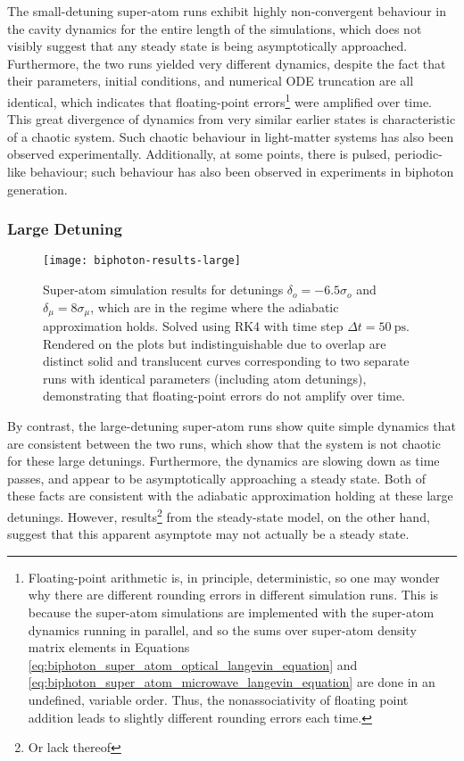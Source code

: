 The small-detuning super-atom runs exhibit highly non-convergent behaviour in the cavity dynamics for the entire length of the simulations, which does not visibly suggest that any steady state is being asymptotically approached. Furthermore, the two runs yielded very different dynamics, despite the fact that their parameters, initial conditions, and numerical ODE truncation are all identical, which indicates that floating-point errors\footnote{Floating-point arithmetic is, in principle, deterministic, so one may wonder why there are different rounding errors in different simulation runs. This is because the super-atom simulations are implemented with the super-atom dynamics running in parallel, and so the sums over super-atom density matrix elements in Equations \ref{eq:biphoton_super_atom_optical_langevin_equation} and \ref{eq:biphoton_super_atom_microwave_langevin_equation} are done in an undefined, variable order. Thus, the nonassociativity of floating point addition leads to slightly different rounding errors each time.} were amplified over time. This great divergence of dynamics from very similar earlier states is characteristic of a chaotic system. Such chaotic behaviour in light-matter systems has also been observed experimentally\cite{chen_2021}. Additionally, at some points, there is pulsed, periodic-like behaviour; such behaviour has also been observed in experiments in biphoton generation\cite{faraon_personal}.

\subsubsection{Large Detuning}
\begin{figure}[ht]
\centering
\texttt{[image: biphoton-results-large]}
\caption{\label{fig:biphoton_results_large} Super-atom simulation results for detunings $\delta_o = -6.5\sigma_o$ and $\delta_\mu = 8\sigma_\mu$, which are in the regime where the adiabatic approximation holds. Solved using RK4 with time step $\Delta t = \qty{50}{\pico\second}$. Rendered on the plots but indistinguishable due to overlap are distinct solid and translucent curves corresponding to two separate runs with identical parameters (including atom detunings), demonstrating that floating-point errors do not amplify over time.}
\end{figure}

By contrast, the large-detuning super-atom runs show quite simple dynamics that are consistent between the two runs, which show that the system is not chaotic for these large detunings. Furthermore, the dynamics are slowing down as time passes, and appear to be asymptotically approaching a steady state. Both of these facts are consistent with the adiabatic approximation holding at these large detunings. However, results\footnote{Or lack thereof} from the steady-state model, on the other hand, suggest that this apparent asymptote may not actually be a steady state.


